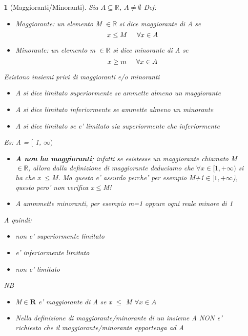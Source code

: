 \documentclass{article}
\theoremstyle{mystyle}
\newtheorem*{mydefinition}{}
\begin{document}
 \begin{mydefinition}[Maggioranti/Minoranti]
     Sia $A\subseteq \mathds{R}$, $A\neq \emptyset$ \newline Def: \begin{itemize}
         \item Maggiorante: un elemento M $\in \mathds{R}$ si dice maggiorante di A se $$x \leq M \hspace{0.5 cm} \forall x \in A$$
         \item Minorante: un elemento m $\in \mathds{R}$ si dice minorante di A se $$x \geq m \hspace{0.5 cm} \forall x \in A$$
     \end{itemize}
     \vspace{0.5cm}
     Esistono insiemi privi di maggioranti e/o minoranti
     \begin{itemize}
         \item A si dice \emph{limitato superiormente} se ammette almeno un maggiorante
         \item A si dice \emph{limitato inferiormente} se ammette almeno un minorante
         \item A si dice \emph{limitato} se e' limitato sia superiormente che inferiormente
     \end{itemize}
     \newline
     Es: \newline
     A = $[$ 1, $\infty)$
     \begin{itemize}
         \item \textbf{A non ha maggioranti}; infatti se esistesse un maggiorante chiamato M $\in \mathds{R}$, allora dalla definizione di maggiorante deduciamo che $\forall x \in [1,+ \infty)$ si ha che x $\leq$M. Ma questo e' assurdo perche' per esempio M+1$\in[1,+\infty$), questo pero' non verifica x$\leq$M!
         \item A ammmette minoranti, per esempio m=1 oppure ogni reale minore di 1
     \end{itemize}
     A quindi: \begin{itemize}
         \item non e' superiormente limitato
         \item e' inferiormente limitato
         \item non e' limitato
     \end{itemize}

     \emph{NB} \begin{itemize}
         \item M$\in \mathbf{R}$ e' maggiorante di A se x $\leq$ M $\forall x \in A$
         \item Nella definizione di maggiorante/minorante di un insieme A \emph{NON e' richiesto} che il maggiorante/minorante \emph{appartenga} ad A
     \end{itemize}
 \end{mydefinition}
\end{document}
